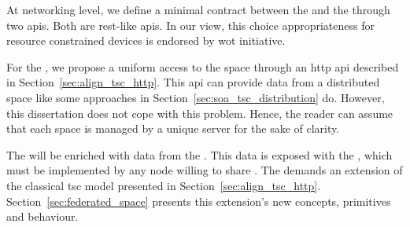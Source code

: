 

At networking level, we define a minimal contract between the \asteroids{} and the \coordinators{} through two \acp{api}.
Both are \ac{rest}-like \acp{api}.
In our view, this choice appropriateness for resource constrained devices is endorsed by \ac{wot} initiative.


For the \coordspace{}, we propose a uniform access to the space through an \acs{http} \ac{api} described in Section~\ref{sec:align_tsc_http}.
This \ac{api} can provide data from a distributed space like some approaches in Section~\ref{sec:soa_tsc_distribution} do.
However, this dissertation does not cope with this problem. %
Hence, the reader can assume that each space is managed by a unique server for the sake of clarity.


The \coordspace{} will be enriched with data from the \outerspace{}. %
This data is exposed with the \osapi{}, which must be implemented by any node willing to share \selfgraphs{}. %
The \outerspace{} demands an extension of the classical \ac{tsc} model presented in Section~\ref{sec:align_tsc_http}.
Section~\ref{sec:federated_space} presents this extension's new concepts, primitives and behaviour.